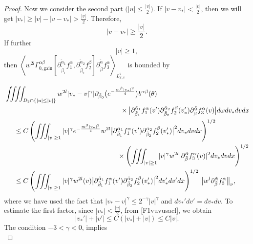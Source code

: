 \documentclass[reqno]{amsart}
\numberwithin{equation}{section}
\numberwithin{equation}{section}
\begin{document}
\begin{proof}
	Now we consider the second part $\big(|u| \leq \frac{|v|}{2}\big)$. If $|v - v_*| < \frac{|v|}{2}$, then we will get $|v_*| \ge |v| - |v - v_*| > \frac{|v|}{2}$. Therefore, 
	$$
	|v - v_*| \geq \frac{|v|}{2}.
	$$
	If further 
	$$
	|v| \ge 1,
	$$
	then  $\left\langle w^{2l} \Gamma_{0,\text{gain}}^{\alpha \beta} [\partial_{\tilde{\beta}_1}^{\tilde{\alpha}_1}f^{\alpha}_1, \partial_{\tilde{\beta}_2}^{\tilde{\alpha}_2}f^{\beta}_2]  \partial_{\tilde{\beta}}^{\tilde{\alpha}}f^{\alpha}_3\right\rangle_{L_{x,v}^2}$  is bounded by 

	\begin{align*}
		&\iiiint_{D_2\cap \{|u|\leq |v|\}} w^{2l} |v_* - v|^\gamma|\partial_{\tilde{\beta}_0}  \big(e^{-\frac{m^{\beta}|v_*|^2}{4}}\big) b^{\alpha\beta}(\theta)\\
		&\hspace{6cm}\times\big|\partial_{\tilde{\beta}_1}^{\tilde{\alpha}_1}f^{\alpha}_1 (v') \partial_{\tilde{\beta}_2}^{\tilde{\alpha}_2}f^{\beta}_2 (v_*') \partial_{\tilde{\beta}}^{\tilde{\alpha}}f^{\alpha}_3 (v)\big|
		 d \omega dv_* dv dx \\
		&\hspace{0.5cm}\le C \left( \iiint_{|v| \geq 1} |v|^\gamma e^{-\frac{m^{\beta}|v_*|^2}{4}} w^{2l} \big| \partial_{\tilde{\beta}_1}^{\tilde{\alpha}_1}f^{\alpha}_1 (v') \partial_{\tilde{\beta}_2}^{\tilde{\alpha}_2}f^{\beta}_2 (v_*') \big|^2 dv_* dv dx\right)^{1/2} \\
		&\hspace{5.5cm}\quad \times \left( \iiint_{|v| \ge 1} |v|^\gamma w^{2l} | \partial_{\tilde{\beta}}^{\tilde{\alpha}}f^{\alpha}_3 (v) |^2 dv_* dv dx \right)^{1/2} \\
		&\hspace{0.5cm}\leq C \left( \iiint_{|v| \ge 1} |v|^\gamma w^{2l}(v) \big| \partial_{\tilde{\beta}_1}^{\tilde{\alpha}_1}f^{\alpha}_1 (v') \partial_{\tilde{\beta}_2}^{\tilde{\alpha}_2}f^{\beta}_2 (v_*') \big|^2 dv_*'dv'dx \right)^{1/2} \big\| w^l \partial_{\tilde{\beta}}^{\tilde{\alpha}}f^{\alpha}_3 \big\|_{\nu},
	\end{align*}
	where we have used the fact that $|v_* - v|^\gamma \le 2^{-\gamma}|v|^\gamma$ and $dv_*'dv'=dv_*dv$. To estimate the first factor,  since $|v_*| \leq \frac{|v|}{2}$, from \eqref{F1vuvusacl}, we obtain
	\begin{equation*}
	|v_*'| + |v'| \le C(|v_*| + |v|) \le C|v|.
	\end{equation*}
	The condition $-3<\gamma < 0$, implies
	\begin{equation}\label{socaled6262d}

\end{equation}
\end{proof}
\end{document}
